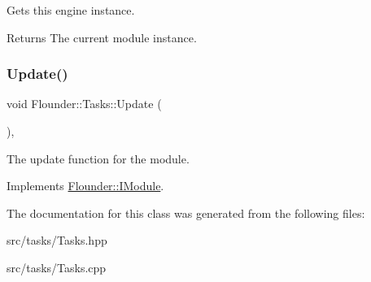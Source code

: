 Gets this engine instance. 

\begin{DoxyReturn}{Returns}
The current module instance. 
\end{DoxyReturn}
\mbox{\label{class_flounder_1_1_tasks_a58e824494498f4a141cf533b44e36761}} 
\subsubsection{\texorpdfstring{Update()}{Update()}}
{\footnotesize\ttfamily void Flounder\+::\+Tasks\+::\+Update (\begin{DoxyParamCaption}{ }\end{DoxyParamCaption})\hspace{0.3cm}{\ttfamily [override]}, {\ttfamily [virtual]}}



The update function for the module. 



Implements \hyperlink{class_flounder_1_1_i_module_a1812bb03a6990e4698a10c043fa25fde}{Flounder\+::\+I\+Module}.



The documentation for this class was generated from the following files\+:\begin{DoxyCompactItemize}
\item 
src/tasks/Tasks.\+hpp\item 
src/tasks/Tasks.\+cpp\end{DoxyCompactItemize}
